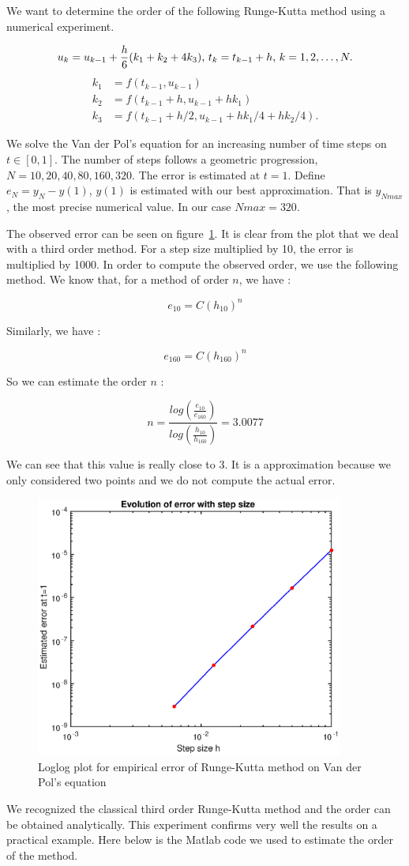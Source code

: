 
We want to determine the order of the following Runge-Kutta method using a numerical experiment. 

$$u_k = u_{k-1} + \dfrac{h}{6}(k_1 + k_2 + 4k_3 )\text{,   } t_k = t_{k-1}+h\text{,   } k=1,2,\dots,N.$$
\begin{align*}
k_1 &= f(t_{k-1},u_{k-1})\\
k_2 &= f(t_{k-1}+h,u_{k-1}+hk_{1})\\
k_3 &= f(t_{k-1}+h/2,u_{k-1}+hk_{1}/4+hk_{2}/4).
\end{align*}

 We solve the Van der Pol's equation for an increasing number of time steps on $t\in[0,1]$. The number of steps follows a geometric progression, $N=10,20,40,80,160,320$. The error is estimated at $t=1$. Define $e_N = y_N -y(1)$, $y(1)$ is estimated with our best approximation. That is $y_{Nmax}$, the most precise numerical value. In our case $Nmax = 320$.

The observed error can be seen on figure~\ref{fig:a1}. It is clear from the plot that we deal with a third order method. For a step size multiplied by 10, the error is multiplied by 1000. In order to compute the observed order, we use the following method. We know that, for a method of order $n$, we have :

$$e_{10} = C (h_{10})^n$$

Similarly, we have :

$$e_{160} = C (h_{160})^n$$

So we can estimate the order $n$ : 

$$ n = \frac{log(\frac{e_{10}}{e_{160}})}{log(\frac{h_{10}}{h_{160}})} = 3.0077$$

We can see that this value is really close to 3. It is a approximation because we only considered two points and we do not compute the actual error.


\begin{figure}[!h]
\centering
\includegraphics[width = 0.9\textwidth]{./a1.eps}
\caption{Loglog plot for empirical error of Runge-Kutta method on Van der Pol's equation}
\label{fig:a1}
\end{figure}

\FloatBarrier
We recognized the classical third order Runge-Kutta method and the order can be obtained analytically. This experiment confirms very well the results on a practical example. Here below is the Matlab code we used to estimate the order of the method.




